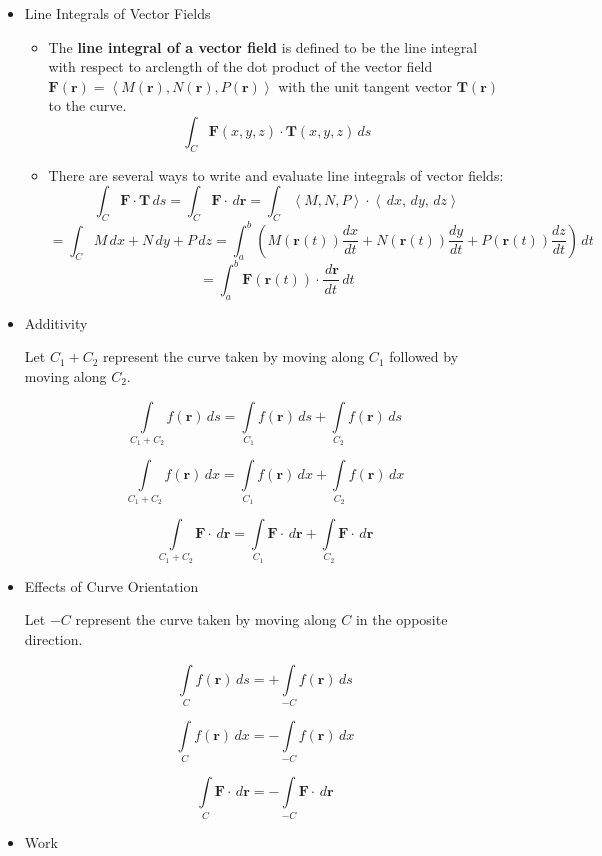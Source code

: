 \documentclass[12pt]{article}
\renewcommand{\vec}[1]{\mathbf{#1}}
\newcommand{\dvar}[1]{\,d{#1}}
\renewcommand{\d}[1]{\dvar{#1}}
\newcommand{\<}{\left<}
\renewcommand{\>}{\right>}
\begin{document}
\begin{itemize}
  \item Line Integrals of Vector Fields

    \begin{itemize}
    \item The \textbf{line integral of a vector field} is defined to be the line integral with respect to arclength of the dot product of the vector field $\vec{F}(\vec{r})=\<M(\vec{r}),N(\vec{r}),P(\vec{r})\>$ with the unit tangent vector $\vec{T}(\vec{r})$ to the curve.
      \[
        \int_C \vec{F}(x,y,z)\cdot\vec{T}(x,y,z)\d{s}
      \]
    \item There are several ways to write and evaluate line integrals of vector fields:
      \[
        \int_C \vec{F}\cdot\vec{T}\d{s} = \int_C \vec{F}\cdot\d{\vec{r}} = \int_C \<M,N,P\>\cdot\<\d x,\d y,\d z\>
      \]
      \[
        = \int_C M\d{x}+N\d{y}+P\d{z} = \int_a^b \left(M(\vec{r}(t))\frac{dx}{dt}+N(\vec{r}(t))\frac{dy}{dt}+P(\vec{r}(t))\frac{dz}{dt}\right)\d{t}
      \]
      \[
        = \int_a^b \vec{F}(\vec{r}(t))\cdot\frac{\d{\vec{r}}}{dt}\d{t}
      \]
    \end{itemize}
    
  \item Additivity

  Let $C_1+C_2$ represent the curve taken by moving along $C_1$ followed by moving along $C_2$.

   \[\int\limits_{C_1+C_2} f(\vec{r})\d{s}=\int\limits_{C_1}f(\vec{r})\d{s}+\int\limits_{C_2}f(\vec{r})\d{s}\]

   \[\int\limits_{C_1+C_2} f(\vec{r})\d{x}=\int\limits_{C_1}f(\vec{r})\d{x}+\int\limits_{C_2}f(\vec{r})\d{x}\]

   \[\int\limits_{C_1+C_2} \vec{F}\cdot\d{\vec{r}}=\int\limits_{C_1}\vec{F}\cdot\d{\vec{r}}+\int\limits_{C_2}\vec{F}\cdot\d{\vec{r}}\]

  \item Effects of Curve Orientation

  Let $-C$ represent the curve taken by moving along $C$ in the opposite direction.

  \[\int\limits_{C} f(\vec{r})\d{s} = +\int\limits_{-C} f(\vec{r})\d{s}\]

  \[\int\limits_{C} f(\vec{r})\d{x} = -\int\limits_{-C} f(\vec{r})\d{x}\]

  \[\int\limits_{C} \vec{F}\cdot\d{\vec{r}} = -\int\limits_{-C} \vec{F}\cdot\d{\vec{r}}\]

  \item Work


\end{itemize}
\end{document}
